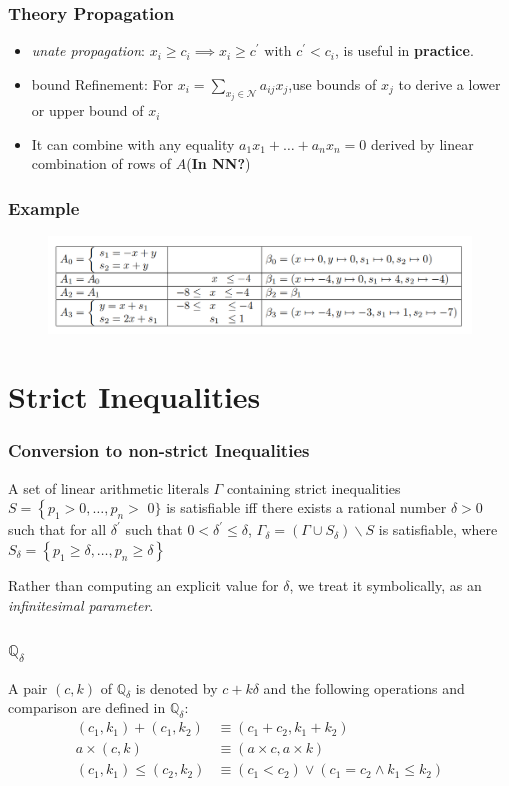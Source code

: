 \documentclass[aspectratio=169%
,serif,mathserif]{beamer}
\begin{document}
\begin{frame}
	\frametitle{Theory Propagation}
	\begin{itemize}
		\item \emph{unate propagation}: $x_i \geq c_i \implies x_{i} \geq c^{\prime} \text { with } c^{\prime}<c_{i}$, is useful in \textbf{practice}.
		\item bound Refinement: For $x_{i}=\sum_{x_{j} \in \mathcal{N}} a_{i j} x_{j}$,use bounds of $x_j$ to derive a lower or upper bound of $x_i$
		\item It can combine with any equality $a_{1} x_{1}+\ldots+a_{n} x_{n}=0$ derived by linear combination of rows of $A$(\textbf{In NN?})
	\end{itemize}
\end{frame}

\begin{frame}
	\frametitle{Example}
	\begin{figure}[htbp]
		\includegraphics[width=1\linewidth]{4.png}
	\end{figure}
\end{frame}

\section{Strict Inequalities}
\begin{frame}
	\frametitle{Conversion to non-strict Inequalities}
	\begin{lemma}
		A set of linear arithmetic literals $\Gamma$ containing strict inequalities $S=\left\{p_{1}>0, \ldots, p_{n}>\right.$ $0\}$ is satisfiable iff there exists a rational number $\delta>0$ such that for all $\delta^{\prime}$ such that $0<\delta^{\prime} \leq \delta$, $\Gamma_{\delta}=\left(\Gamma \cup S_{\delta}\right) \backslash S$ is satisfiable, where $S_{\delta}=\left\{p_{1} \geq \delta, \ldots, p_{n} \geq \delta\right\}$
	\end{lemma}
	Rather than computing an explicit value for $\delta$, we treat it symbolically, as an \emph{infinitesimal parameter}.
\end{frame}

\begin{frame}
	\frametitle{$\mathbb{Q}_{\delta}$}
	A pair $(c, k)$ of $\mathbb{Q}_{\delta}$ is denoted by $c+k \delta$ and the following operations and comparison are defined in $\mathbb{Q}_{\delta}$:
	$$
	\begin{aligned}
		\left(c_{1}, k_{1}\right)+\left(c_{1}, k_{2}\right) & \equiv\left(c_{1}+c_{2}, k_{1}+k_{2}\right) \\
		a \times(c, k) & \equiv(a \times c, a \times k) \\
		\left(c_{1}, k_{1}\right) \leq\left(c_{2}, k_{2}\right) & \equiv\left(c_{1}<c_{2}\right) \vee\left(c_{1}=c_{2} \wedge k_{1} \leq k_{2}\right)
	\end{aligned}
	$$
\end{frame}
\end{document}
